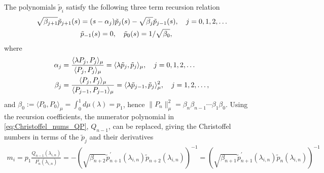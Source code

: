 \documentclass[english,12pt]{ttuthes}
\begin{document}
The polynomials $\tilde{p}_i$ satisfy the following three term
recursion relation \cite{Gautschi:2004:OP} 
%
\begin{align}\label{eq:ON_3term_recursion}
  \sqrt{\beta_{j+1}}\tilde{p}_{j+1}(s)&=(s-\alpha_j)\tilde{p}_{j}(s)
                            -\sqrt{\beta_j}\tilde{p}_{j-1}(s),
                            \quad j=0,1,2,\ldots\\
  &\tilde{p}_{-1}(s)=0, \quad  \tilde{p}_{0}(s)=1/\sqrt{\beta_0},\notag 
\end{align}
%
where \cite{Gautschi:2004:OP,Deift:2000:RMT}
%
\begin{align}\label{eq:recursion_coeff}
  \alpha_j&=\frac{\langle\lambda P_j,P_j\rangle_\mu}{ \langle P_j,P_j\rangle_\mu}=\langle\lambda\tilde{p}_j,\tilde{p}_j\rangle_\mu,
    \quad j=0,1,2,\ldots \\
  \beta_j&=\frac{\langle P_j,P_j\rangle_\mu}{ \langle P_{j-1},P_{j-1}\rangle_\mu}= \langle\lambda\tilde{p}_{j-1},\tilde{p}_j\rangle_\mu^2,\notag
  \quad j=1,2,\ldots,  
\end{align}
%
and $\beta_0:=\langle P_0,P_0\rangle_\mu=\int_0^1d\mu(\lambda)=p_1$, hence
$\|P_n\|_\mu^2=\beta_n\beta_{n-1}\cdots\beta_1\beta_0$. Using the recursion coefficients, the
numerator polynomial in \eqref{eq:Christoffel_nums_QP}, $Q_{n-1}$, can be
replaced, giving the Christoffel numbers in terms of the $\tilde{p}_j$
and their derivatives \cite{Assche:JCAM:1991:237}
%
\begin{align}\label{eq:Christoffel_nums}
   m_i=p_1\frac{Q_{n-1}(\lambda_{i,n})}{P_n^\prime(\lambda_{i,n})}
     =-(\sqrt{\beta_{n+2}}\tilde{p}_{n+1}^\prime(\lambda_{i,n})\tilde{p}_{n+2}(\lambda_{i,n}))^{-1}
     =(\sqrt{\beta_{n+1}}\tilde{p}_{n+1}^\prime(\lambda_{i,n})\tilde{p}_n(\lambda_{i,n}))^{-1}
\end{align}
%
\end{document}
